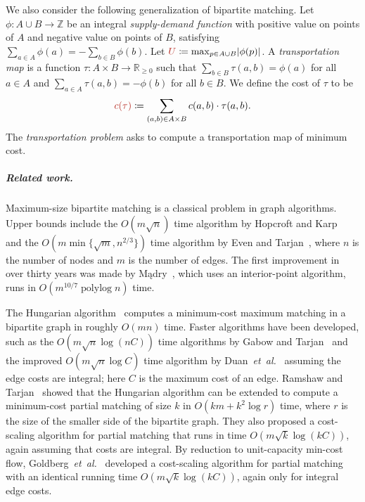 \documentclass[a4paper,UKenglish]{socg-lipics-v2019}
\def\etal{\emph{et~al.}}
\def\etal{\textit{et~al.}}
\def\polylog{\mathop{\mathrm{polylog}}}
\def\reals{\mathbb{R}}
\def\ints{\mathbb{Z}}
\def\abs#1{\mathopen| #1 \mathclose|}		%
\def\tsupply{\phi}
\def\cost{c}
\theoremstyle{plain}
\numberwithin{figure}{section}
\renewcommand{\paragraph}{\subparagraph}
\def\EMPH#1{\textcolor{BrickRed}{{\emph{#1}}}}
\begin{document}
We also consider the following generalization of bipartite matching.
Let $\tsupply:A \cup B \to \ints$ be an integral \EMPH{supply-demand function} with
positive value on points of $A$ and negative value on points of $B$, satisfying
$\sum_{a \in A} \tsupply(a) = - \sum_{b \in B} \tsupply(b)$.
Let $\EMPH{$U$} \coloneqq \max_{p \in A \cup B} \abs{\tsupply(p)}$.
A \EMPH{transportation map} is a function $\tau: A \times B \to \reals_{\geq 0}$
such that $\sum_{b \in B} \tau(a, b) = \tsupply(a)$ for all $a \in A$ and
$\sum_{a \in A} \tau(a, b) = -\tsupply(b)$ for all $b \in B$.
We define the cost of $\tau$ to be
\begin{equation*}
	\EMPH{$\cost(\tau)$} \coloneqq \sum_{(a, b) \in A \times B} c(a, b) \cdot \tau(a, b).
\end{equation*}
The \EMPH{transportation problem} asks to compute a transportation map of minimum cost.


\paragraph{Related work.}
Maximum-size bipartite matching is a classical problem in graph algorithms.
Upper bounds include the $O(m\sqrt{n})$ time algorithm by
Hopcroft and Karp~\cite{HK73} and the $O(m \min\{\sqrt{m}, n^{2/3}\})$ time
algorithm by Even and Tarjan~\cite{ET75}, where $n$ is the
number of nodes and $m$ is the number of edges.
The first improvement in over thirty years was made by M{\k a}dry~\cite{M13},
which uses an interior-point algorithm, runs in $O(m^{10/7}\polylog n)$ time.

The Hungarian algorithm~\cite{Kuhn55} computes a minimum-cost maximum matching
in a bipartite graph in roughly $O(mn)$ time.
Faster algorithms have been developed,
such as the $O(m\sqrt{n}\log(nC))$ time algorithms by Gabow and
Tarjan~\cite{GT89} and the improved $O(m\sqrt{n}\log C)$ time algorithm by
Duan~\etal~\cite{DPS18} assuming the edge costs are integral;
here $C$ is the maximum cost of an edge.
Ramshaw and Tarjan~\cite{RT12} showed that the Hungarian algorithm can be extended to compute a minimum-cost partial
matching of size $k$ in $O(km + k^2\log r)$ time, where $r$ is the size of the smaller side of the bipartite graph.
They also proposed a cost-scaling algorithm for partial
matching that runs in time $O(m\sqrt{k}\log(kC))$, again assuming that costs
are integral.
By reduction to unit-capacity min-cost flow, Goldberg~\etal~\cite{GHKT17}
developed a cost-scaling algorithm for partial matching with an identical running time
$O(m\sqrt{k}\log(kC))$,
again only for integral edge costs.
\end{document}
